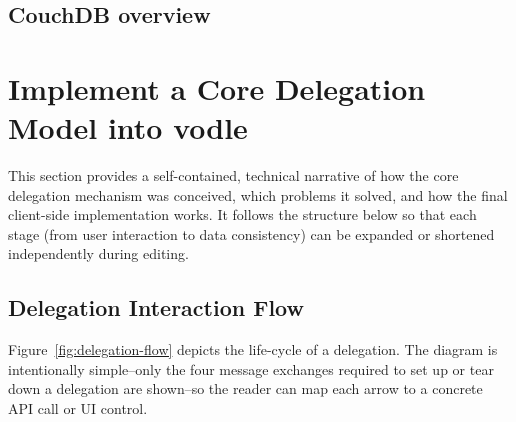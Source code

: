 \subsection{CouchDB overview}
% 
% 

\section{Implement a Core Delegation Model into vodle}
\label{sec:core_delegation_detailed}

This section provides a self-contained, technical narrative of how the core delegation mechanism was conceived, which problems it solved, and how the final client-side implementation works. It follows the structure below so that each stage (from user interaction to data consistency) can be expanded or shortened independently during editing.

\subsection{Delegation Interaction Flow}
Figure~\ref{fig:delegation-flow} depicts the life-cycle of a delegation. The diagram is intentionally simple--only the four message exchanges required to set up or tear down a delegation are shown--so the reader can map each arrow to a concrete API call or UI control.

